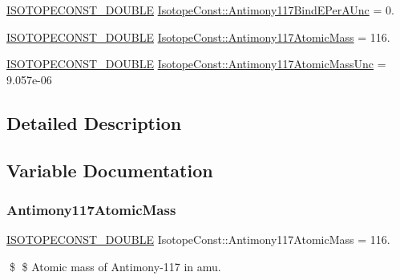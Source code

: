 \begin{DoxyCompactItemize}
\mbox{\hyperlink{group___isotope_const-_macros_ga8f45a7272ce02c0b4c65c44636ed719a}{I\+S\+O\+T\+O\+P\+E\+C\+O\+N\+S\+T\+\_\+\+D\+O\+U\+B\+LE}} \mbox{\hyperlink{group___isotope_const-_antimony-_sb117_ga8635e51dfdd3bc3c92c9fed700081a86}{Isotope\+Const\+::\+Antimony117\+Bind\+E\+Per\+A\+Unc}} = 0.
\item 
\mbox{\hyperlink{group___isotope_const-_macros_ga8f45a7272ce02c0b4c65c44636ed719a}{I\+S\+O\+T\+O\+P\+E\+C\+O\+N\+S\+T\+\_\+\+D\+O\+U\+B\+LE}} \mbox{\hyperlink{group___isotope_const-_antimony-_sb117_ga2be2ba70f17d4705523777b8f1b301ea}{Isotope\+Const\+::\+Antimony117\+Atomic\+Mass}} = 116.
\item 
\mbox{\hyperlink{group___isotope_const-_macros_ga8f45a7272ce02c0b4c65c44636ed719a}{I\+S\+O\+T\+O\+P\+E\+C\+O\+N\+S\+T\+\_\+\+D\+O\+U\+B\+LE}} \mbox{\hyperlink{group___isotope_const-_antimony-_sb117_ga350ffe960056a4901cbe1464ecbe4bc3}{Isotope\+Const\+::\+Antimony117\+Atomic\+Mass\+Unc}} = 9.\+057e-\/06
\end{DoxyCompactItemize}


\subsection{Detailed Description}


\subsection{Variable Documentation}
\mbox{\label{group___isotope_const-_antimony-_sb117_ga2be2ba70f17d4705523777b8f1b301ea}} 
\subsubsection{\texorpdfstring{Antimony117\+Atomic\+Mass}{Antimony117AtomicMass}}
{\footnotesize\ttfamily \mbox{\hyperlink{group___isotope_const-_macros_ga8f45a7272ce02c0b4c65c44636ed719a}{I\+S\+O\+T\+O\+P\+E\+C\+O\+N\+S\+T\+\_\+\+D\+O\+U\+B\+LE}} Isotope\+Const\+::\+Antimony117\+Atomic\+Mass = 116.}

\$ \$ Atomic mass of Antimony-\/117 in amu. \mbox{\label{group___isotope_const-_antimony-_sb117_ga350ffe960056a4901cbe1464ecbe4bc3}} 
